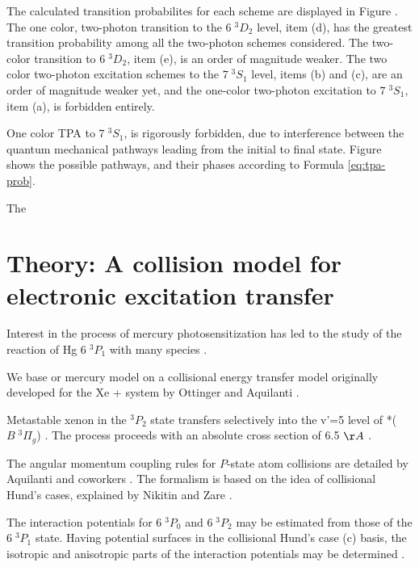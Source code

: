 \documentclass[12pt]{mitthesis}
\begin{document}

The calculated transition probabilites for each scheme are displayed
in Figure .  The one color, two-photon
transition to the $6 \; ^3D_2$ level, item (d), has the greatest
transition probability among all the two-photon schemes considered.
The two-color transition to $6 \; ^3D_2$, item (e), is an order of
magnitude weaker.  The two color two-photon excitation schemes to the
$7 \; ^3S_1$ level, items (b) and (c), are an order of magnitude
weaker yet, and the one-color two-photon excitation to $7 \; ^3S_1$,
item (a), is forbidden entirely.

One color TPA to $7 \; ^3S_1$, is rigorously forbidden, due to
interference between the quantum mechanical pathways leading from the
initial to final state.  Figure  shows the
possible pathways, and their phases according to Formula
\ref{eq:tpa-prob}.

The 

\section{Theory: A collision model for electronic excitation transfer}

Interest in the process of mercury photosensitization has led to the
study of the reaction of Hg $6 \; ^3P_1$ with many species
\cite{duval91, ohmori96}.

We base or mercury model on a collisional energy transfer model
originally developed for the Xe +  system by Ottinger and
Aquilanti \cite{aquilanti90, aquilanti94}.

Metastable xenon in the $^3P_2$ state transfers selectively into the
v'=5 level of *($B\; ^3\Pi_g$) \cite{krumpelmann87,
  krumpelmann88, ottinger95b, aardema94}.  The process proceeds with
an absolute cross section of 6.5 $\AA$ \cite{bohle89}.

The angular momentum coupling rules for $P$-state atom collisions are
detailed by Aquilanti and coworkers \cite{aquilanti80a, aquilanti80b}.
The formalism is based on the idea of collisional Hund's cases,
explained by Nikitin and Zare \cite{nikitin94}.

The interaction potentials for $6 \; ^3P_0$ and $6 \; ^3P_2$ may be
estimated from those of the $6 \; ^3P_1$ state.  Having potential
surfaces in the collisional Hund's case (c) basis, the isotropic and
anisotropic parts of the interaction potentials may be determined
\cite{aquilanti89}.
\end{document}
